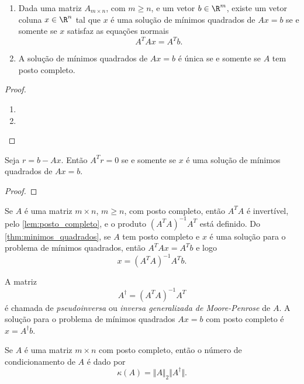 \documentclass{article}
\begin{document}
\begin{thm}\label{thm:minimos_quadrados}
    \begin{enumerate}
        \item [a.] Dada uma matriz \(A_{m \times n}\), com \(m \geq n\), e um vetor \(b \in \R^m\), existe um vetor coluna \(x \in \R^n\) tal que \(x\) é uma solução de mínimos quadrados de \(Ax=b\) se e somente se \(x\) satisfaz as equações normais
        \[
            A^TAx = A^Tb.
        \]
        \item [b.] A solução de mínimos quadrados de \(Ax=b\) é única se e somente se \(A\) tem posto completo.
    \end{enumerate}
\end{thm}

\begin{proof}
    \begin{enumerate}
        \item [a.] 
        \item [b.] 
    \end{enumerate}
\end{proof}

\begin{thm} 
    Seja \(r = b - Ax\). Então \(A^Tr = 0\) se e somente se \(x\) é uma solução de mínimos quadrados de \(Ax=b\).
\end{thm}

\begin{proof}
    
\end{proof}

Se \(A\) é uma matriz \(m \times n\), \(m \geq n\), com posto completo, então \(A^TA\) é invertível, pelo \autoref{lem:posto_completo}, e o produto \((A^TA)^{-1}A^T\) está definido. Do \autoref{thm:minimos_quadrados}, se \(A\) tem posto completo e \(x\) é uma solução para o problema de mínimos quadrados, então \(A^TAx = A^Tb\) e logo
\[
    x = (A^TA)^{-1}A^Tb.
\]

\begin{defn}
    A matriz
    \begin{equation}
        A^{\dagger} = (A^TA)^{-1}A^T
    \end{equation}
    é chamada de \emph{pseudoinversa} ou \emph{inversa generalizada de Moore-Penrose} de \(A\). A solução para o problema de mínimos quadrados \(Ax=b\) com posto completo é \(x = A^{\dagger}b\).
\end{defn}

\begin{defn}
    Se \(A\) é uma matriz \(m \times n\) com posto completo, então o número de condicionamento de \(A\) é dado por
    \begin{equation}
        \kappa(A) = \Vert A \Vert_2 \Vert A^{\dagger} \Vert.
    \end{equation}
\end{defn}
\end{document}
